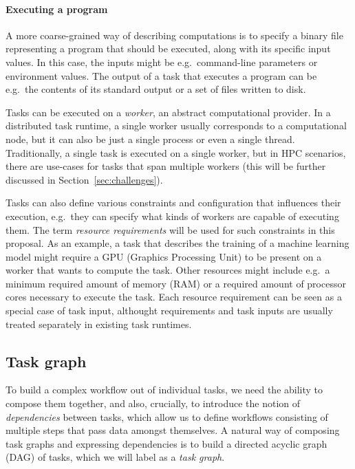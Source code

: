 \paragraph{Executing a program} A more coarse-grained way of describing computations is to specify
a binary file representing a program that should be executed, along with its specific input values.
In this case, the inputs might be e.g.\ command-line parameters or environment values. The
output of a task that executes a program can be e.g.\ the contents of its standard output or a set
of files written to disk.

\vspace{3mm}Tasks can be executed on a \emph{worker}, an abstract computational provider. In a
distributed task runtime, a single worker usually corresponds to a computational node, but
it can also be just a single process or even a single thread. Traditionally, a single
task is executed on a single worker, but in HPC scenarios, there are use-cases for tasks that
span multiple workers (this will be further discussed in Section~\ref{sec:challenges}).

Tasks can also define various constraints and configuration that influences their execution,
e.g.\ they can specify what kinds of workers are capable of executing them.
The term \emph{resource requirements} will be used for such constraints in this proposal. As an
example, a task that describes the training of a machine learning model might require a GPU
(Graphics Processing Unit) to be present on a worker that wants to compute the task. Other
resources might include e.g.\ a minimum required amount of memory (RAM) or a required amount of
processor cores necessary to execute the task. Each resource requirement can be seen as a
special case of task input, althought requirements and task inputs are usually treated
separately in existing task runtimes.

\subsection{Task graph}
To build a complex workflow out of individual tasks, we need the ability to compose them together,
and also, crucially, to introduce the notion of \emph{dependencies} between tasks, which allow us
to define workflows consisting of multiple steps that pass data amongst themselves.
A natural way of composing task graphs and expressing dependencies is to build a directed acyclic
graph (DAG) of tasks, which we will label as a \emph{task graph}.

